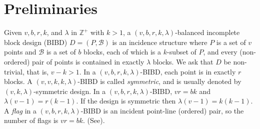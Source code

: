 \documentclass[letterpaper,10pt]{article}
\theoremstyle{plain}
\theoremstyle{definition}
\begin{document}
\section{Preliminaries}\label{prem}
Given $v,b,r,k$, and $\lambda$ in $\mathbb{Z}^+$ with $k>1$, a $(v,b,r,k,\lambda)$-balanced incomplete block design (BIBD) $D=(P,\mathcal{B})$ is an incidence structure where $P$ is a set of $v$ points and $\mathcal{B}$ is a set of $b$ blocks, each of which is a $k$-subset of $P$, and every (non-ordered) pair of points is contained in exactly $\lambda$ blocks. We ask that $D$  be non-trivial, that is, $v-k>1$. In a $(v,b,r,k,\lambda)$-BIBD, each point is in exactly $r$ blocks. A $(v,v,k,k,\lambda)$-BIBD is called {\em{symmetric}}, and is usually denoted by $(v,k,\lambda)$-symmetric design. In a $(v,b,r,k,\lambda)$-BIBD, $vr=bk$ and $\lambda(v-1)=r(k-1)$. If the design is symmetric then $\lambda(v-1)=k(k-1)$. A {\em{flag}} in a $(v,b,r,k,\lambda)$-BIBD is an incident point-line (ordered) pair, so the number of flags is $vr=bk$. (See\cite{St}).\\
\end{document}
